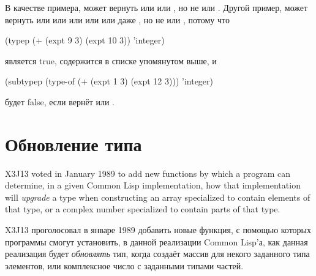 \begin{defun}[Function]
\begin{new}
В качестве примера,  может вернуть
 или  или , но не
 или .
Другой пример,  может вернуть  или 
или  или  или  или даже , но не  или , потому что
\begin{lisp}
(typep (+ (expt 9 3) (expt 10 3)) 'integer)
\end{lisp}
является true,  содержится в списке упомянутом выше, и 
\begin{lisp}
(subtypep (type-of (+ (expt 1 3) (expt 12 3))) 'integer)
\end{lisp}
будет false, если  вернёт  или .

\end{new}
\end{defun}

\section{Обновление типа}

X3J13 voted in January 1989
to add new functions by which a program
can determine, in a given Common Lisp implementation, how that
implementation will \emph{upgrade} a type when constructing an array
specialized to contain elements of that type,
or a complex number specialized to contain parts of that type.

X3J13 проголосовал в январе 1989
добавить новые функция, с помощью которых программы смогут установить, в данной
реализации Common Lisp'а, как данная реализация будет \emph{обновлять} тип,
когда создаёт массив для некого заданного типа элементов, или комплексное число с
заданными типами частей.

